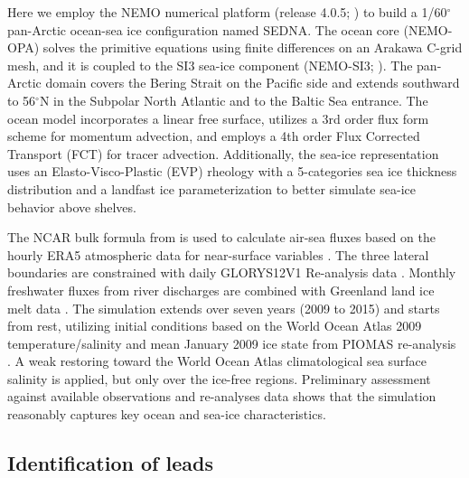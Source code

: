 \documentclass[lineno,sn-basic]{sn-jnl}%
\begin{document}
Here we employ the NEMO numerical platform (release 4.0.5; \citealp{NEMO_man}) to build a 1/60$^\circ$ pan-Arctic ocean-sea ice configuration named SEDNA. The ocean core (NEMO-OPA) solves the primitive equations using finite differences on an Arakawa C-grid mesh, and it is coupled to the SI3 sea-ice component (NEMO-SI3; \citealp{SI3_man}). The pan-Arctic domain covers the Bering Strait on the Pacific side and extends southward to 56$^\circ$N in the Subpolar North Atlantic and to the Baltic Sea entrance. The ocean model incorporates a linear free surface, utilizes a 3rd order flux form scheme for momentum advection, and employs a 4th order Flux Corrected Transport (FCT) for tracer advection. Additionally, the sea-ice representation uses an Elasto-Visco-Plastic (EVP) rheology with a 5-categories sea ice thickness distribution and a landfast ice parameterization to better simulate sea-ice behavior above shelves.

The NCAR bulk formula from \citet{Large_global_2009} is used to calculate air-sea fluxes based on the hourly ERA5 atmospheric data for near-surface variables \citep{Hersbach_ERA5_2020}. The three lateral boundaries are constrained with daily GLORYS12V1 Re-analysis data \citep{GLORYS12}. Monthly freshwater fluxes from river discharges are combined with Greenland land ice melt data \citep{HuEA_rivers_2019}. The simulation extends over seven years (2009 to 2015) and starts from rest, utilizing initial conditions based on the World Ocean Atlas 2009 temperature/salinity and mean January 2009 ice state from PIOMAS re-analysis \citep{Locarnini_data_2010, PIOMAS}. A weak restoring toward the World Ocean Atlas climatological sea surface salinity is applied, but only over the ice-free regions. Preliminary assessment against available observations and re-analyses data shows that the simulation reasonably captures key ocean and sea-ice characteristics.

\subsection*{Identification of leads}
\end{document}
